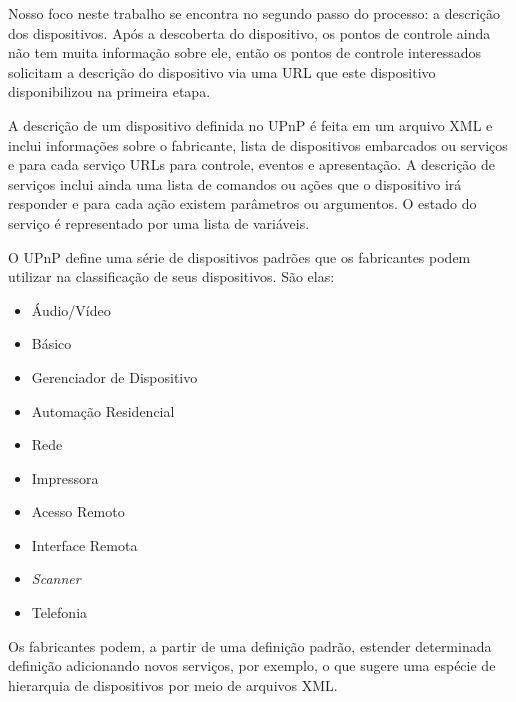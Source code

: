 Nosso foco neste trabalho se encontra no segundo passo do processo: a descrição dos dispositivos. Após a descoberta do dispositivo, os pontos de controle ainda não tem muita informação sobre ele, então os pontos de controle interessados solicitam a descrição do dispositivo via uma URL que este dispositivo disponibilizou na primeira etapa.

A descrição de um dispositivo definida no UPnP é feita em um arquivo XML e inclui informações sobre o fabricante, lista de dispositivos embarcados ou serviços e para cada serviço URLs para controle, eventos e apresentação. A descrição de serviços inclui ainda uma lista de comandos ou ações que o dispositivo irá responder e para cada ação existem parâmetros ou argumentos. O estado do serviço é representado por uma lista de variáveis.

O UPnP define uma série de dispositivos padrões que os fabricantes podem utilizar na classificação de seus dispositivos. São elas:

\begin{itemize}
\item Áudio/Vídeo
\item Básico
\item Gerenciador de Dispositivo
\item Automação Residencial
\item Rede
\item Impressora
\item Acesso Remoto
\item Interface Remota
\item \emph{Scanner}
\item Telefonia
\end{itemize}

Os fabricantes podem, a partir de uma definição padrão, estender determinada definição adicionando novos serviços, por exemplo, o que sugere uma espécie de hierarquia de dispositivos por meio de arquivos XML.



